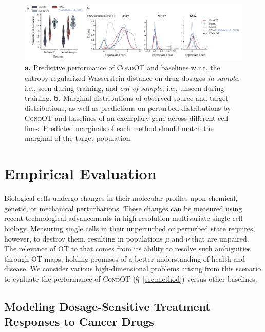 \begin{figure}
    \centering
    \includegraphics[width=1.2\textwidth]{figures/fig_sciplex_main_results.pdf}
    \caption{\textbf{a.}  Predictive performance of \textsc{CondOT} and baselines w.r.t. the entropy-regularized Wasserstein distance on drug dosages \emph{in-sample}, i.e., seen during training, and \emph{out-of-sample}, i.e., unseen during training. \textbf{b.} Marginal distributions of observed source and target distributions, as well as predictions on perturbed distributions by \textsc{CondOT} and baselines of an exemplary gene across different cell lines. Predicted marginals of each method should match the marginal of the target population.}
    \label{fig:exp_scalar_sciplex}
\end{figure}

\vspace{-5pt}
\section{Empirical Evaluation} \label{sec:evaluation}
\vspace{-5pt}

 Biological cells undergo changes in their molecular profiles upon chemical, genetic, or mechanical perturbations. These changes can be measured using recent technological advancements in high-resolution multivariate single-cell biology. Measuring single cells in their unperturbed or perturbed state requires, however, to destroy them, resulting in populations $\mu$ and $\nu$ that are unpaired. The relevance of OT to that comes from its ability to resolve such ambiguities through OT maps, 
holding promises of a better understanding of health and disease. 
We consider various high-dimensional problems arising from this scenario to evaluate the performance of \textsc{CondOT} (\S~\ref{sec:method}) versus other baselines.

\subsection{Modeling Dosage-Sensitive Treatment Responses to Cancer Drugs} \label{sec:eval_scalar}

